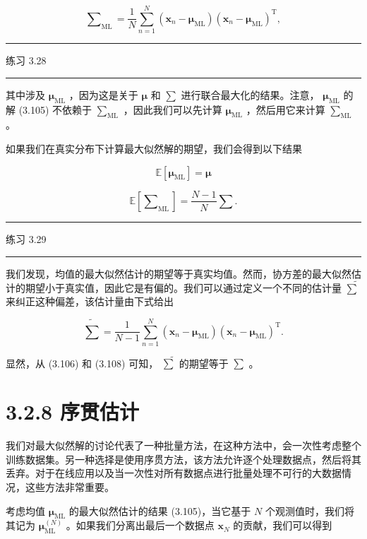 \documentclass[10pt]{report}
\newcommand{\HRule}{\begin{center}\rule{0.9\linewidth}{0.2mm}\end{center}}
\begin{document}
\[
{\mathbf{\sum }}_{\mathrm{{ML}}} = \frac{1}{N}\mathop{\sum }\limits_{{n = 1}}^{N}\left( {{\mathbf{x}}_{n} - {\mathbf{\mu }}_{\mathrm{{ML}}}}\right) {\left( {\mathbf{x}}_{n} - {\mathbf{\mu }}_{\mathrm{{ML}}}\right) }^{\mathrm{T}}, \tag{3.106}
\]

\HRule

练习 3.28

\HRule

其中涉及 \({\mathbf{\mu }}_{\mathrm{{ML}}}\) ，因为这是关于 \(\mathbf{\mu }\) 和 \(\mathbf{\sum }\) 进行联合最大化的结果。注意， \({\mathbf{\mu }}_{\mathrm{{ML}}}\) 的解 (3.105) 不依赖于 \({\mathbf{\sum }}_{\mathrm{{ML}}}\) ，因此我们可以先计算 \({\mathbf{\mu }}_{\mathrm{{ML}}}\) ，然后用它来计算 \({\mathbf{\sum }}_{\mathrm{{ML}}}\) 。

如果我们在真实分布下计算最大似然解的期望，我们会得到以下结果

\[
\mathbb{E}\left\lbrack  {\mathbf{\mu }}_{\mathrm{{ML}}}\right\rbrack   = \mathbf{\mu } \tag{3.107}
\]

\[
\mathbb{E}\left\lbrack  {\mathbf{\sum }}_{\mathrm{{ML}}}\right\rbrack   = \frac{N - 1}{N}\mathbf{\sum }. \tag{3.108}
\]

\HRule

练习 3.29

\HRule

我们发现，均值的最大似然估计的期望等于真实均值。然而，协方差的最大似然估计的期望小于真实值，因此它是有偏的。我们可以通过定义一个不同的估计量 \(\widetilde{\mathbf{\sum }}\) 来纠正这种偏差，该估计量由下式给出

\[
\widetilde{\mathbf{\sum }} = \frac{1}{N - 1}\mathop{\sum }\limits_{{n = 1}}^{N}\left( {{\mathbf{x}}_{n} - {\mathbf{\mu }}_{\mathrm{{ML}}}}\right) {\left( {\mathbf{x}}_{n} - {\mathbf{\mu }}_{\mathrm{{ML}}}\right) }^{\mathrm{T}}. \tag{3.109}
\]

显然，从 (3.106) 和 (3.108) 可知， \(\widetilde{\mathbf{\sum }}\) 的期望等于 \(\mathbf{\sum }\) 。

\section*{3.2.8 序贯估计}

我们对最大似然解的讨论代表了一种批量方法，在这种方法中，会一次性考虑整个训练数据集。另一种选择是使用序贯方法，该方法允许逐个处理数据点，然后将其丢弃。对于在线应用以及当一次性对所有数据点进行批量处理不可行的大数据情况，这些方法非常重要。

考虑均值 \({\mathbf{\mu }}_{\mathrm{{ML}}}\) 的最大似然估计的结果 (3.105)，当它基于 \(N\) 个观测值时，我们将其记为 \({\mathbf{\mu }}_{\mathrm{{ML}}}^{\left( N\right) }\) 。如果我们分离出最后一个数据点 \({\mathbf{x}}_{N}\) 的贡献，我们可以得到
\end{document}
